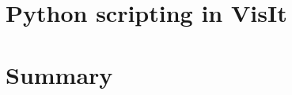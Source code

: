 \documentclass[xcolor=svgnames]{beamer}
\providecommand{\sectionpage}{\Large\centering \bf\mediumblue\insertsection}
\begin{document}
\section{Python scripting in VisIt}
\frame{\sectionpage}

\section{Summary}
\frame{\sectionpage}

\end{document}
